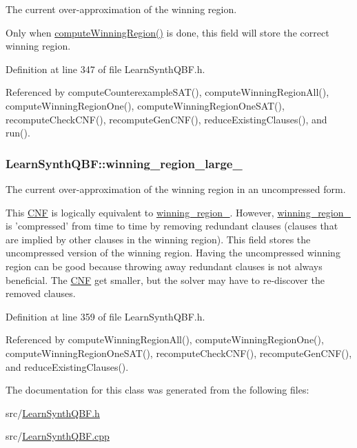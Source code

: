 The current over-\/approximation of the winning region. 

Only when \hyperlink{classLearnSynthQBF_ae8219ab3e4987775e1d6a006a9d38f4d}{compute\-Winning\-Region()} is done, this field will store the correct winning region. 

Definition at line 347 of file Learn\-Synth\-Q\-B\-F.\-h.



Referenced by compute\-Counterexample\-S\-A\-T(), compute\-Winning\-Region\-All(), compute\-Winning\-Region\-One(), compute\-Winning\-Region\-One\-S\-A\-T(), recompute\-Check\-C\-N\-F(), recompute\-Gen\-C\-N\-F(), reduce\-Existing\-Clauses(), and run().

\hypertarget{classLearnSynthQBF_aa9b460cdc140c3969a32ea77982181d2}{
\subsubsection[{winning\-\_\-region\-\_\-large\-\_\-}]{ Learn\-Synth\-Q\-B\-F\-::winning\-\_\-region\-\_\-large\-\_\-\hspace{0.3cm}{\ttfamily [protected]}}}\label{classLearnSynthQBF_aa9b460cdc140c3969a32ea77982181d2}


The current over-\/approximation of the winning region in an uncompressed form. 

This \hyperlink{classCNF}{C\-N\-F} is logically equivalent to \hyperlink{classLearnSynthQBF_a9c6b41f7df5f4ed4bfc5930136fc1152}{winning\-\_\-region\-\_\-}. However, \hyperlink{classLearnSynthQBF_a9c6b41f7df5f4ed4bfc5930136fc1152}{winning\-\_\-region\-\_\-} is 'compressed' from time to time by removing redundant clauses (clauses that are implied by other clauses in the winning region). This field stores the uncompressed version of the winning region. Having the uncompressed winning region can be good because throwing away redundant clauses is not always beneficial. The \hyperlink{classCNF}{C\-N\-F} get smaller, but the solver may have to re-\/discover the removed clauses. 

Definition at line 359 of file Learn\-Synth\-Q\-B\-F.\-h.



Referenced by compute\-Winning\-Region\-All(), compute\-Winning\-Region\-One(), compute\-Winning\-Region\-One\-S\-A\-T(), recompute\-Check\-C\-N\-F(), recompute\-Gen\-C\-N\-F(), and reduce\-Existing\-Clauses().



The documentation for this class was generated from the following files\-:\begin{DoxyCompactItemize}
\item 
src/\hyperlink{LearnSynthQBF_8h}{Learn\-Synth\-Q\-B\-F.\-h}\item 
src/\hyperlink{LearnSynthQBF_8cpp}{Learn\-Synth\-Q\-B\-F.\-cpp}\end{DoxyCompactItemize}
